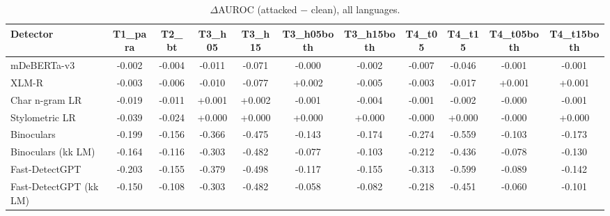 \begin{table}[t]
\centering
\small
\caption{$\Delta$AUROC (attacked $-$ clean), all languages.}
\label{tab:robust}
\begin{tabular}{lcccccccccc}
\toprule
Detector & T1_para & T2_bt & T3_h05 & T3_h15 & T3_h05both & T3_h15both & T4_t05 & T4_t15 & T4_t05both & T4_t15both \\
\midrule
mDeBERTa-v3 & -0.002 & -0.004 & -0.011 & -0.071 & -0.000 & -0.002 & -0.007 & -0.046 & -0.001 & -0.001 \\
XLM-R & -0.003 & -0.006 & -0.010 & -0.077 & +0.002 & -0.005 & -0.003 & -0.017 & +0.001 & +0.001 \\
Char n-gram LR & -0.019 & -0.011 & +0.001 & +0.002 & -0.001 & -0.004 & -0.001 & -0.002 & -0.000 & -0.001 \\
Stylometric LR & -0.039 & -0.024 & +0.000 & +0.000 & +0.000 & +0.000 & -0.000 & +0.000 & -0.000 & +0.000 \\
Binoculars & -0.199 & -0.156 & -0.366 & -0.475 & -0.143 & -0.174 & -0.274 & -0.559 & -0.103 & -0.173 \\
Binoculars (kk LM) & -0.164 & -0.116 & -0.303 & -0.482 & -0.077 & -0.103 & -0.212 & -0.436 & -0.078 & -0.130 \\
Fast-DetectGPT & -0.203 & -0.155 & -0.379 & -0.498 & -0.117 & -0.155 & -0.313 & -0.599 & -0.089 & -0.142 \\
Fast-DetectGPT (kk LM) & -0.150 & -0.108 & -0.303 & -0.482 & -0.058 & -0.082 & -0.218 & -0.451 & -0.060 & -0.101 \\
\bottomrule
\end{tabular}
\end{table}